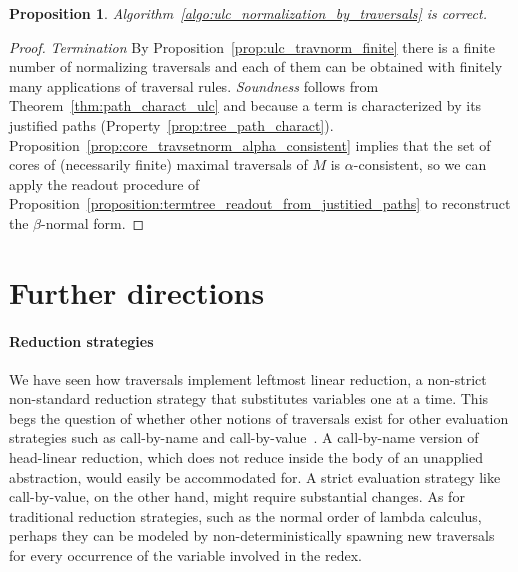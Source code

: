 \documentclass{elsarticle}
\theoremstyle{plain}
\newtheorem{proposition}[theorem]{Proposition}
\theoremstyle{definition}
\newcommand{\travulc}{\travset}
\newcommand\pathset{{\mathcal{P}aths}} %
\begin{document}
\begin{proposition}
    Algorithm~\ref{algo:ulc_normalization_by_traversals} is correct.
\end{proposition}
\begin{proof}
\emph{Termination}  By Proposition~\ref{prop:ulc_travnorm_finite} there is a finite number of normalizing traversals and each of them can be obtained with finitely many applications of traversal rules.
%
\emph{Soundness} follows from Theorem~\ref{thm:path_charact_ulc} and because a term is  characterized by its justified paths (Property~\ref{prop:tree_path_charact}).
Proposition~\ref{prop:core_travsetnorm_alpha_consistent}
implies that
the set of cores of (necessarily finite) maximal traversals of $M$
is $\alpha$-consistent, so we can
apply the readout procedure of Proposition~\ref{proposition:termtree_readout_from_justitied_paths} to
reconstruct the $\beta$-normal form.
\end{proof}


\section{Further directions}

\paragraph{Reduction strategies} We have seen how traversals implement leftmost linear reduction,
a non-strict non-standard reduction strategy that substitutes variables one at a time. This begs the question of whether other notions of traversals
exist for other evaluation strategies such as call-by-name and call-by-value~\cite{plotkin-75}. A call-by-name version of head-linear reduction, which does not reduce inside the body of an unapplied abstraction, would easily be accommodated for. A strict evaluation strategy like call-by-value, on the other hand, might require substantial changes. As for traditional reduction strategies, such as the normal order of lambda calculus,
perhaps they can be modeled by non-deterministically spawning new traversals for every occurrence of the variable involved in the redex.
\end{document}
